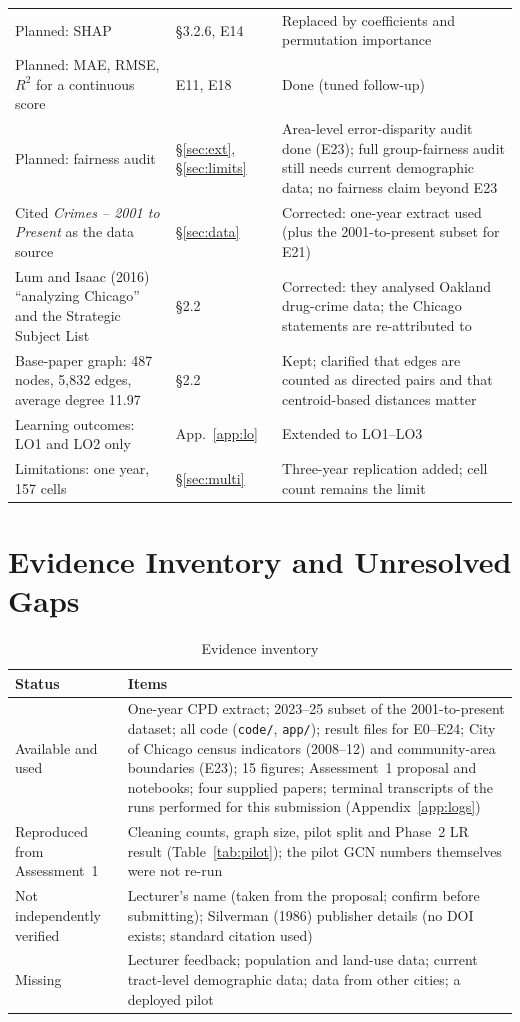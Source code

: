 \documentclass[11pt,a4paper]{report}
\begin{document}
\begin{table}[H]
\begin{tabularx}{\textwidth}{@{}L{4.6cm} L{2.9cm} Y@{}}
Planned: SHAP & \S3.2.6, E14 & Replaced by coefficients and permutation importance\\
Planned: MAE, RMSE, $R^2$ for a continuous score & E11, E18 & Done (tuned follow-up)\\
Planned: fairness audit & \S\ref{sec:ext}, \S\ref{sec:limits} & Area-level error-disparity audit done (E23); full group-fairness audit still needs current demographic data; no fairness claim beyond E23\\
Cited \emph{Crimes -- 2001 to Present} as the data source & \S\ref{sec:data} & Corrected: one-year extract used (plus the 2001-to-present subset for E21)\\
Lum and Isaac (2016) ``analyzing Chicago'' and the Strategic Subject List & \S2.2 & Corrected: they analysed Oakland drug-crime data; the Chicago statements are re-attributed to \citet{richardson2019}\\
Base-paper graph: 487 nodes, 5,832 edges, average degree 11.97 & \S2.2 & Kept; clarified that edges are counted as directed pairs and that centroid-based distances matter\\
Learning outcomes: LO1 and LO2 only & App.~\ref{app:lo} & Extended to LO1--LO3\\
Limitations: one year, 157 cells & \S\ref{sec:multi} & Three-year replication added; cell count remains the limit\\
\bottomrule
\end{tabularx}
\end{table}

\chapter{Evidence Inventory and Unresolved Gaps}
\label{app:gaps}
\begin{table}[H]
\centering\scriptsize
\caption{Evidence inventory}
\label{tab:inventory}
\begin{tabularx}{\textwidth}{@{}L{3.0cm} Y@{}}
\toprule
Status & Items\\
\midrule
Available and used & One-year CPD extract; 2023--25 subset of the 2001-to-present dataset; all code (\texttt{code/}, \texttt{app/}); result files for E0--E24; City of Chicago census indicators (2008--12) and community-area boundaries (E23); 15 figures; Assessment~1 proposal and notebooks; four supplied papers; terminal transcripts of the runs performed for this submission (Appendix~\ref{app:logs})\\
Reproduced from Assessment~1 & Cleaning counts, graph size, pilot split and Phase~2 LR result (Table~\ref{tab:pilot}); the pilot GCN numbers themselves were not re-run\\
Not independently verified & Lecturer's name (taken from the proposal; confirm before submitting); Silverman (1986) publisher details (no DOI exists; standard citation used)\\
Missing & Lecturer feedback; population and land-use data; current tract-level demographic data; data from other cities; a deployed pilot\\
\bottomrule
\end{tabularx}
\end{table}
\end{document}
